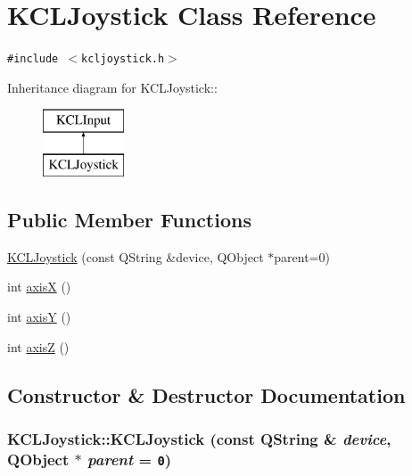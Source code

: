 \hypertarget{class_k_c_l_joystick}{
\section{KCLJoystick Class Reference}
\label{class_k_c_l_joystick}
}
{\tt \#include $<$kcljoystick.h$>$}

Inheritance diagram for KCLJoystick::\begin{figure}[H]
\begin{center}
\leavevmode
\includegraphics[height=2cm]{class_k_c_l_joystick}
\end{center}
\end{figure}
\subsection*{Public Member Functions}
\begin{CompactItemize}
\item 
\hyperlink{class_k_c_l_joystick_9a424984a46254d07b3ab6b6f5946830}{KCLJoystick} (const QString \&device, QObject $\ast$parent=0)
\item 
int \hyperlink{class_k_c_l_joystick_70988b3702bf410f86a66fb1277913fd}{axisX} ()
\item 
int \hyperlink{class_k_c_l_joystick_0055ef283714ae8545021761e2903376}{axisY} ()
\item 
int \hyperlink{class_k_c_l_joystick_d70bc33c4d0d9d92ec2583f723f157d3}{axisZ} ()
\end{CompactItemize}


\subsection{Constructor \& Destructor Documentation}
\hypertarget{class_k_c_l_joystick_9a424984a46254d07b3ab6b6f5946830}{
\subsubsection[{KCLJoystick}]{\setlength{\rightskip}{0pt plus 5cm}KCLJoystick::KCLJoystick (const QString \& {\em device}, \/  QObject $\ast$ {\em parent} = {\tt 0})}}
\label{class_k_c_l_joystick_9a424984a46254d07b3ab6b6f5946830}




